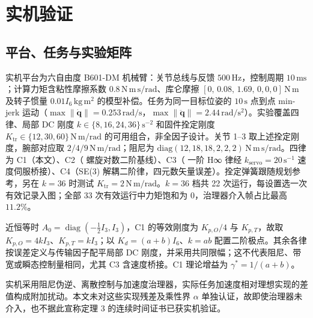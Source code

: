 \section{实机验证}\label{sec:hardware}

\subsection{平台、任务与实验矩阵}

实机平台为六自由度 B601-DM 机械臂：关节总线与反馈 $500\,\mathrm{Hz}$，控制周期 $10\,\mathrm{ms}$；计算力矩含粘性摩擦系数 $0.8\,\mathrm{N\,m\,s/rad}$、库仑摩擦 $[0,\,0.08,\,1.69,\,0,0,0]\,\mathrm{N\,m}$ 及转子惯量 $0.01I_6\,\mathrm{kg\,m^2}$ 的模型补偿。任务为同一目标位姿的 $10\,\mathrm{s}$ 点到点 min-jerk 运动（$\max\|\dot{\boldsymbol q}\|=0.253\,\mathrm{rad/s}$，$\max\|\ddot{\boldsymbol q}\|=2.44\,\mathrm{rad/s^2}$）。实验覆盖四律、局部 DC 刚度 $k\in\{8,16,24,36\}\,\mathrm{s^{-2}}$ 和固件拴定刚度 $K_{\mathrm{tr}}\in\{12,30,60\}\,\mathrm{N\,m/rad}$ 的可用组合，非全因子设计。关节 1--3 取上述拴定刚度，腕部对应取 $2/4/9\,\mathrm{N\,m/rad}$；阻尼为 $\mathrm{diag}(12,18,18,2,2,2)\,\mathrm{N\,m\,s/rad}$。四律为 C1（本文）、C2（\cite{Ch20} 螺旋对数二阶基线）、C3（\cite{P2} 一阶 H∞ 律经 $k_{\mathrm{servo}}=20\,\mathrm{s^{-1}}$ 速度伺服桥接）、C4（SE(3) 解耦二阶律，四元数矢量误差）。拴定弹簧跟随规划参考，另在 $k=36$ 时测试 $K_{\mathrm{tr}}=2\,\mathrm{N\,m/rad}$。$k=36$ 档共 22 次运行，每设置选一次有效记录入图；全部 33 次有效运行中力矩饱和为 0，治理器介入帧占比最高 $11.2\%$。

近恒等时 $A_0=\operatorname{diag}(-\tfrac12I_3,I_3)$，C1 的等效刚度为 $K_{p,O}/4$ 与 $K_{p,T}$，故取 $K_{p,O}=4kI_3$、$K_{p,T}=kI_3$；以 $K_d=(a+b)I_6$、$k=ab$ 配置二阶极点。其余各律按误差定义与传输因子配平局部 DC 刚度，并采用共同限幅；这不代表阻尼、带宽或瞬态控制量相同，尤其 C3 含速度桥接。C1 理论增益为 $\gamma^*=1/(a+b)$。

实机采用阻尼伪逆、离散控制与加速度治理器，实际任务加速度相对理想实现的差值构成附加扰动。本文未对这些实现残差及乘性界 $\alpha$ 单独认证，故即使治理器未介入，也不据此宣称定理 3 的连续时间证书已获实机验证。

